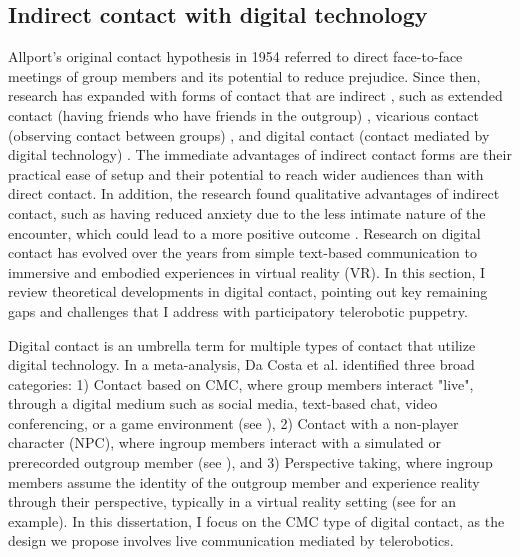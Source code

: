 \documentclass[dissertation,math,vertlayout,pdfa,colorlinks]{aaltoseries}
\begin{document}
\subsection{Indirect contact with digital technology}
\label{sec:indirect_contact}
Allport's original contact hypothesis in 1954 \cite{allportNaturePrejudice1954} referred to direct face-to-face meetings of group members and its potential to reduce prejudice. Since then, research has expanded with forms of contact that are indirect \cite{whiteDirectContactTheoretical2021}, such as extended contact (having friends who have friends in the outgroup) \cite{wrightExtendedContactEffect1997,zhouExtendedContactHypothesis2019}, vicarious contact (observing contact between groups) \cite{gomezVicariousIntergroupContact2008,vezzaliImprovingIntergroupRelations2014}, and digital contact (contact mediated by digital technology) \cite{pereiradacostaDoesDigitalIntergroup2024}. The immediate advantages of indirect contact forms are their practical ease of setup and their potential to reach wider audiences than with direct contact. In addition, the research found qualitative advantages of indirect contact, such as having reduced anxiety due to the less intimate nature of the encounter, which could lead to a more positive outcome \cite{whiteDirectContactTheoretical2021}. Research on digital contact has evolved over the years from simple text-based communication to immersive and embodied experiences in virtual reality (VR). In this section, I review theoretical developments in digital contact, pointing out key remaining gaps and challenges that I address with participatory telerobotic puppetry.

Digital contact is an umbrella term for multiple types of contact that utilize digital technology. In a meta-analysis, Da Costa et al. \cite{pereiradacostaDoesDigitalIntergroup2024} identified three broad categories: 1) Contact based on CMC, where group members interact "live", through a digital medium such as social media, text-based chat, video conferencing, or a game environment (see \cite{whiteTextbasedEcontactHarnessing2020,imperatoAllportMeetsInternet2021,amzalagImprovingIntergroupRelations2021,amichai-hamburgerContactHypothesisReconsidered2006, benatovGamingPeaceVirtual2021}), 2) Contact with a non-player character (NPC), where ingroup members interact with a simulated or prerecorded outgroup member (see \cite{haslerVirtualPeacemakersMimicry2014,kabiljoVirtualRealityFostering2019}), and 3) Perspective taking, where ingroup members assume the identity of the outgroup member and experience reality through their perspective, typically in a virtual reality setting (see \cite{hassonEnemysGazeImmersive2019} for an example). In this dissertation, I focus on the CMC type of digital contact, as the design we propose involves live communication mediated by telerobotics. 
\end{document}
